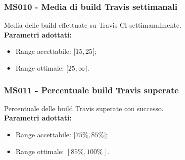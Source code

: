 \subsubsection{MS010 - Media di build Travis settimanali}\mbox{}
Media delle build effettuate su Travis CI settimanalmente.\\[0,2cm]
\textbf{Parametri adottati:}
\begin{itemize}
	\item Range accettabile: $[15,25[$;
	\item Range ottimale: $[25,\infty)$.
\end{itemize}

\subsubsection{MS011 - Percentuale build Travis superate}\mbox{}
Percentuale delle build Travis superate con successo.\\[0,2cm]
\textbf{Parametri adottati:}
\begin{itemize}
	\item Range accettabile: $[75\%,85\%[$;
	\item Range ottimale: $[85\%,100\%]$.
\end{itemize}